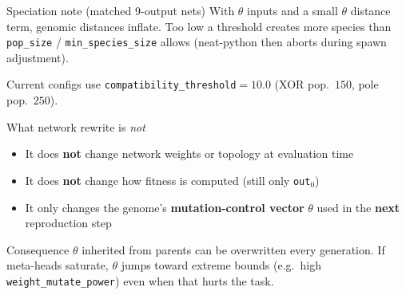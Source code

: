 \documentclass[aspectratio=169,11pt]{beamer}
\begin{document}
\begin{frame}{Speciation note (matched 9-output nets)}
  With $\theta$ inputs and a small $\theta$ distance term, genomic distances inflate.
  Too low a threshold creates more species than
  \texttt{pop\_size} / \texttt{min\_species\_size} allows
  (neat-python then aborts during spawn adjustment).

  \vspace{0.6em}
  Current configs use \texttt{compatibility\_threshold}${}=10.0$
  (XOR pop.\ $150$, pole pop.\ $250$).
\end{frame}

\begin{frame}{What network rewrite is \emph{not}}
  \begin{itemize}
    \item It does \textbf{not} change network weights or topology at evaluation time
    \item It does \textbf{not} change how fitness is computed (still only \texttt{out}$_0$)
    \item It only changes the genome's \textbf{mutation-control vector} $\theta$
      used in the \textbf{next} reproduction step
  \end{itemize}

  \vspace{0.6em}
  \begin{alertblock}{Consequence}
    $\theta$ inherited from parents can be overwritten every generation.
    If meta-heads saturate, $\theta$ jumps toward extreme bounds
    (e.g.\ high \texttt{weight\_mutate\_power}) even when that hurts the task.
  \end{alertblock}
\end{frame}
\end{document}
